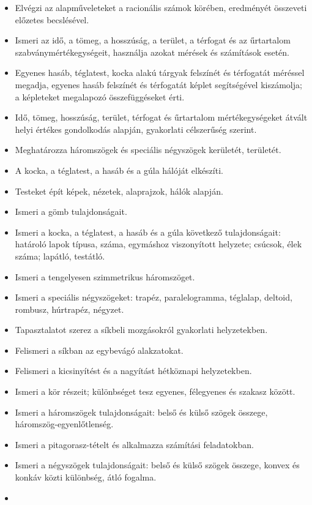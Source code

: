 \begin{itemize}
\item
  Elvégzi az alapműveleteket a racionális számok körében, eredményét
  összeveti előzetes becslésével.
\item
  Ismeri az idő, a tömeg, a hosszúság, a terület, a térfogat és az
  űrtartalom szabványmértékegységeit, használja azokat mérések és
  számítások esetén.
\item
  Egyenes hasáb, téglatest, kocka alakú tárgyak felszínét és térfogatát
  méréssel megadja, egyenes hasáb felszínét és térfogatát képlet
  segítségével kiszámolja; a képleteket megalapozó összefüggéseket érti.
\item
  Idő, tömeg, hosszúság, terület, térfogat és űrtartalom
  mértékegységeket átvált helyi értékes gondolkodás alapján, gyakorlati
  célszerűség szerint.
\item
  Meghatározza háromszögek és speciális négyszögek kerületét, területét.
\item
  A kocka, a téglatest, a hasáb és a gúla hálóját elkészíti.
\item
  Testeket épít képek, nézetek, alaprajzok, hálók alapján.
\item
  Ismeri a gömb tulajdonságait.
\item
  Ismeri a kocka, a téglatest, a hasáb és a gúla következő
  tulajdonságait: határoló lapok típusa, száma, egymáshoz viszonyított
  helyzete; csúcsok, élek száma; lapátló, testátló.
\item
  Ismeri a tengelyesen szimmetrikus háromszöget.
\item
  Ismeri a speciális négyszögeket: trapéz, paralelogramma, téglalap,
  deltoid, rombusz, húrtrapéz, négyzet.
\item
  Tapasztalatot szerez a síkbeli mozgásokról gyakorlati helyzetekben.
\item
  Felismeri a síkban az egybevágó alakzatokat.
\item
  Felismeri a kicsinyítést és a nagyítást hétköznapi helyzetekben.
\item
  Ismeri a kör részeit; különbséget tesz egyenes, félegyenes és szakasz
  között.
\item
  Ismeri a háromszögek tulajdonságait: belső és külső szögek összege,
  háromszög-egyenlőtlenség.
\item
  Ismeri a pitagorasz-tételt és alkalmazza számítási feladatokban.
\item
  Ismeri a négyszögek tulajdonságait: belső és külső szögek összege,
  konvex és konkáv közti különbség, átló fogalma.
\item

\end{itemize}
